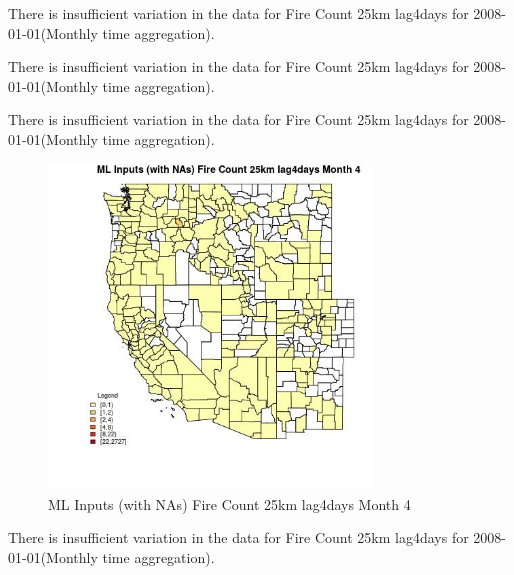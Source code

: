 There is insufficient variation in the data for Fire Count 25km lag4days for 2008-01-01(Monthly time aggregation). 
 

There is insufficient variation in the data for Fire Count 25km lag4days for 2008-01-01(Monthly time aggregation). 
 

There is insufficient variation in the data for Fire Count 25km lag4days for 2008-01-01(Monthly time aggregation). 
 

\begin{figure} 
\centering  
\includegraphics[width=0.77\textwidth]{Code_Outputs/Report_ML_input_PM25_Step4_part_f_de_duplicated_aves_prioritize_24hr_obswNAs_CountyFire_Count_25km_lag4daysmedianMonth4.jpg} 
\caption{\label{fig:Report_ML_input_PM25_Step4_part_f_de_duplicated_aves_prioritize_24hr_obswNAsCountyFire_Count_25km_lag4daysmedianMonth4}ML Inputs (with NAs) Fire Count 25km lag4days Month 4} 
\end{figure} 
 

There is insufficient variation in the data for Fire Count 25km lag4days for 2008-01-01(Monthly time aggregation). 
 

